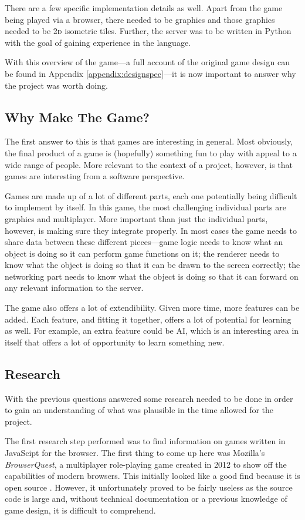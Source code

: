 There are a few specific implementation details as well. Apart from the game being played via a browser, there needed to be graphics and those graphics needed to be \textsc{2d} isometric tiles. Further, the server was to be written in Python with the goal of gaining experience in the language.

With this overview of the game---a full account of the original game design can be found in Appendix \ref{appendix:designspec}---it is now important to answer why the project was worth doing.

\subsection{Why Make The Game?}
The first answer to this is that games are interesting in general. Most obviously, the final product of a game is (hopefully) something fun to play with appeal to a wide range of people. More relevant to the context of a project, however, is that games are interesting from a software perspective.

Games are made up of a lot of different parts, each one potentially being difficult to implement by itself. In this game, the most challenging individual parts are graphics and multiplayer. More important than just the individual parts, however, is making sure they integrate properly. In most cases the game needs to share data between these different pieces---game logic needs to know what an object is doing so it can perform game functions on it; the renderer needs to know what the object is doing so that it can be drawn to the screen correctly; the networking part needs to know what the object is doing so that it can forward on any relevant information to the server.

The game also offers a lot of extendibility. Given more time, more features can be added. Each feature, and fitting it together, offers a lot of potential for learning as well. For example, an extra feature could be AI, which is an interesting area in itself that offers a lot of opportunity to learn something new.

\subsection{Research}
With the previous questions answered some research needed to be done in order to gain an understanding of what was plausible in the time allowed for the project.

The first research step performed was to find information on games written in JavaScipt for the browser. The first thing to come up here was Mozilla's \textit{BrowserQuest}\cite{citeulike:13139186, citeulike:13139189}, a multiplayer role-playing game created in 2012 to show off the capabilities of modern browsers. This initially looked like a good find because it is open source \cite{citeulike:13139194}. However, it unfortunately proved to be fairly useless as the source code is large and, without technical documentation or a previous knowledge of game design, it is difficult to comprehend.

